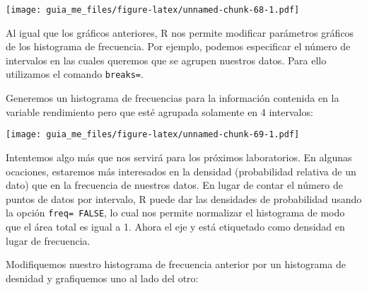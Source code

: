 \documentclass[]{book}
\newenvironment{Shaded}{\begin{snugshade}}{\end{snugshade}}
\newcommand{\DataTypeTok}[1]{\textcolor[rgb]{0.13,0.29,0.53}{#1}}
\newcommand{\DecValTok}[1]{\textcolor[rgb]{0.00,0.00,0.81}{#1}}
\newcommand{\FloatTok}[1]{\textcolor[rgb]{0.00,0.00,0.81}{#1}}
\newcommand{\KeywordTok}[1]{\textcolor[rgb]{0.13,0.29,0.53}{\textbf{#1}}}
\newcommand{\NormalTok}[1]{#1}
\newcommand{\OperatorTok}[1]{\textcolor[rgb]{0.81,0.36,0.00}{\textbf{#1}}}
\newcommand{\OtherTok}[1]{\textcolor[rgb]{0.56,0.35,0.01}{#1}}
\newcommand{\StringTok}[1]{\textcolor[rgb]{0.31,0.60,0.02}{#1}}
\begin{document}
\texttt{[image: guia\_me\_files/figure-latex/unnamed-chunk-68-1.pdf]}

Al igual que los gráficos anteriores, R nos permite modificar parámetros gráficos de los histograma de
frecuencia. Por ejemplo, podemos especificar el número de intervalos en las cuales queremos que se agrupen
nuestros datos. Para ello utilizamos el comando \texttt{breaks=}.

Generemos un histograma de frecuencias para la información contenida en la variable rendimiento pero que
esté agrupada solamente en 4 intervalos:

\begin{Shaded}
\end{Shaded}

\texttt{[image: guia\_me\_files/figure-latex/unnamed-chunk-69-1.pdf]}

Intentemos algo más que nos servirá para los próximos laboratorios. En algunas ocaciones, estaremos más
interesados en la densidad (probabilidad relativa de un dato) que en la frecuencia de nuestros datos. En lugar
de contar el número de puntos de datos por intervalo, R puede dar las densidades de probabilidad usando la
opción \texttt{freq=\ FALSE}, lo cual nos permite normalizar el histograma de modo que el área total es igual a 1.
Ahora el eje y está etiquetado como densidad en lugar de frecuencia.

Modifiquemos nuestro histograma de frecuencia anterior por un histograma de desnidad y grafiquemos uno
al lado del otro:

\begin{Shaded}
\end{Shaded}
\end{document}
